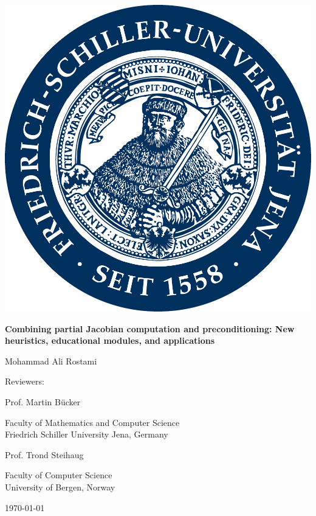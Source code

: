 \documentclass[12pt, twoside,a4paper,toc=bibliography]{scrbook}
\begin{document}
\begin{titlepage}
\centering
\includegraphics[width=0.3\linewidth]{logo}
\par
\vspace{1cm}
{\Large\textbf{Combining partial Jacobian computation and preconditioning:
New heuristics, educational modules, and applications}\par}
\vspace{1cm}
{\Large Mohammad Ali Rostami\par}
\vspace{2cm}
{\large Reviewers:\par}
\vspace{0.6cm}
{\Large Prof. Martin B{\"u}cker\par}
{\Large Faculty of Mathematics and Computer Science\\Friedrich Schiller University Jena, Germany\par}
\vspace{1cm}
{\Large Prof. Trond Steihaug\par}
{\Large Faculty of Computer Science\\University of Bergen, Norway\par}
\vspace{1cm}
{\Large \today}
\end{titlepage}
\end{document}
